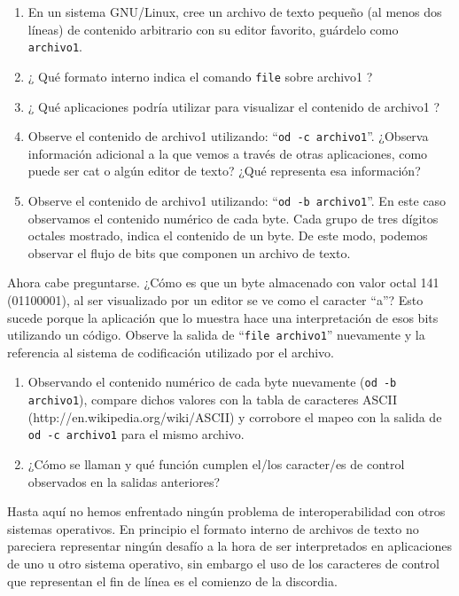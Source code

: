 \documentclass[12pt]{article}
\begin{document}
\begin{enumerate}
\item En un sistema GNU/Linux, cree un archivo de texto pequeño (al menos dos líneas) 
      de contenido arbitrario con su editor favorito, guárdelo como {\tt archivo1}.
\item ¿ Qué formato interno indica el comando {\tt file} sobre archivo1 ? 
\item ¿ Qué aplicaciones podría utilizar para visualizar el contenido de archivo1 ?
\item Observe el contenido de archivo1 utilizando: ``{\tt od -c archivo1}''. ¿Observa
      información adicional a la que vemos a través de otras aplicaciones, como 
      puede ser cat o algún editor de texto? ¿Qué representa esa información?
\item Observe el contenido de archivo1 utilizando: ``{\tt od -b archivo1}''. En este
      caso observamos el contenido numérico de cada byte. Cada grupo de tres
      dígitos octales mostrado, indica el contenido de un byte. De este modo, 
      podemos observar el flujo de bits que componen un archivo de texto.
\end{enumerate}
Ahora cabe preguntarse. ¿Cómo es que un byte almacenado con valor octal 
141 (01100001), al ser visualizado por un editor se ve como el caracter ``a''? 
Esto sucede porque la aplicación que lo muestra hace una interpretación de esos
bits utilizando un código. Observe la salida de ``{\tt file archivo1}'' nuevamente y
la referencia al sistema de codificación utilizado por el archivo. 
\begin{enumerate}
\item Observando el contenido numérico de cada byte nuevamente ({\tt od -b archivo1}), 
compare dichos valores con la tabla de caracteres ASCII 
(http://en.wikipedia.org/wiki/ASCII) y corrobore el mapeo con la salida de {\tt od -c archivo1}  
para el mismo archivo.
\item ¿Cómo se llaman y qué función cumplen el/los caracter/es de control observados
en la salidas anteriores? 
\end{enumerate}

Hasta aquí no hemos enfrentado ningún problema de interoperabilidad con otros 
sistemas operativos. En principio el formato interno de archivos de texto no 
pareciera representar ningún desafío a la hora de ser interpretados en aplicaciones
de uno u otro sistema operativo, sin embargo el uso de los caracteres de control 
que representan el fin de línea es el comienzo de la discordia. 
\end{document}

